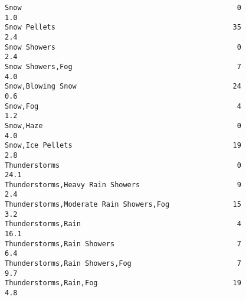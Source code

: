 \documentclass[11pt]{article}
\begin{document}
\begin{tcolorbox}[breakable, size=fbox, boxrule=.5pt, pad at break*=1mm, opacityfill=0]
\begin{Verbatim}[commandchars=\\\{\}]
Snow                                                   0            1.0
Snow Pellets                                          35            2.4
Snow Showers                                           0            2.4
Snow Showers,Fog                                       7            4.0
Snow,Blowing Snow                                     24            0.6
Snow,Fog                                               4            1.2
Snow,Haze                                              0            4.0
Snow,Ice Pellets                                      19            2.8
Thunderstorms                                          0           24.1
Thunderstorms,Heavy Rain Showers                       9            2.4
Thunderstorms,Moderate Rain Showers,Fog               15            3.2
Thunderstorms,Rain                                     4           16.1
Thunderstorms,Rain Showers                             7            6.4
Thunderstorms,Rain Showers,Fog                         7            9.7
Thunderstorms,Rain,Fog                                19            4.8


\end{Verbatim}
\end{tcolorbox}
\end{document}
